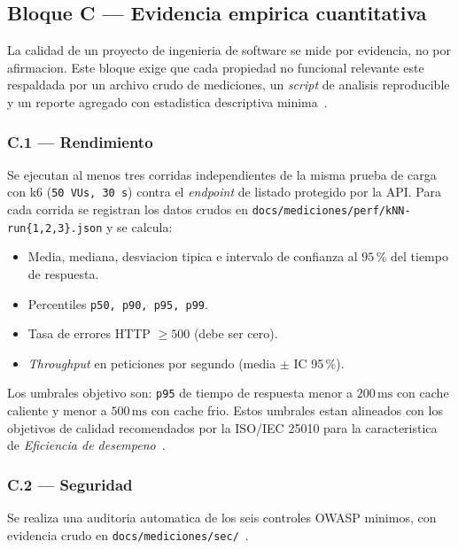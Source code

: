 \documentclass[11pt,a4paper]{article}
\begin{document}
\subsection{Bloque C --- Evidencia empirica cuantitativa}

La calidad de un proyecto de ingenieria de software se mide por evidencia, no por afirmacion. Este bloque exige que cada propiedad no funcional relevante este respaldada por un archivo crudo de mediciones, un \emph{script} de analisis reproducible y un reporte agregado con estadistica descriptiva minima~\cite{wohlin2012experimentation,washizaki2024swebok}.

\subsubsection*{C.1 --- Rendimiento}

Se ejecutan al menos tres corridas independientes de la misma prueba de carga con k6 (\texttt{50 VUs, 30 s}) contra el \emph{endpoint} de listado protegido por la API. Para cada corrida se registran los datos crudos en \texttt{docs/mediciones/perf/kNN-run\{1,2,3\}.json} y se calcula:

\begin{itemize}
    \item Media, mediana, desviacion tipica e intervalo de confianza al $95$\,\% del tiempo de respuesta.
    \item Percentiles \texttt{p50, p90, p95, p99}.
    \item Tasa de errores HTTP $\geq 500$ (debe ser cero).
    \item \emph{Throughput} en peticiones por segundo (media $\pm$ IC 95\,\%).
\end{itemize}

Los umbrales objetivo son: \texttt{p95} de tiempo de respuesta menor a $200\,\text{ms}$ con cache caliente y menor a $500\,\text{ms}$ con cache frio. Estos umbrales estan alineados con los objetivos de calidad recomendados por la ISO/IEC 25010 para la caracteristica de \emph{Eficiencia de desempeno}~\cite{iso25010}.

\subsubsection*{C.2 --- Seguridad}

Se realiza una auditoria automatica de los seis controles OWASP minimos, con evidencia crudo en \texttt{docs/mediciones/sec/}~\cite{owasp2021top10}.
\end{document}
